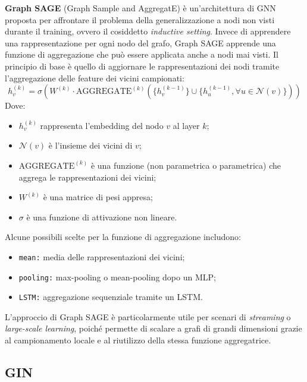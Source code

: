 \textbf{Graph SAGE} (Graph Sample and AggregatE) è un'architettura di GNN proposta per affrontare il problema della generalizzazione a nodi non visti durante il training, ovvero il cosiddetto \textit{inductive setting}. Invece di apprendere una rappresentazione per ogni nodo del grafo, Graph SAGE apprende una funzione di aggregazione che può essere applicata anche a nodi mai visti. Il principio di base è quello di aggiornare le rappresentazioni dei nodi tramite l'aggregazione delle feature dei vicini campionati:
\[
    h_v^{(k)} = \sigma\left(W^{(k)} \cdot \text{AGGREGATE}^{(k)}\left(\{h_v^{(k-1)}\} \cup \{h_u^{(k-1)}, \forall u \in \mathcal{N}(v)\}\right)\right)
\]
Dove:
\begin{itemize}
    \item \( h_v^{(k)} \) rappresenta l'embedding del nodo \( v \) al layer \( k \);
    \item \( \mathcal{N}(v) \) è l'insieme dei vicini di \( v \);
    \item \( \text{AGGREGATE}^{(k)} \) è una funzione (non parametrica o parametrica) che aggrega le rappresentazioni dei vicini;
    \item \( W^{(k)} \) è una matrice di pesi appresa;
    \item \( \sigma \) è una funzione di attivazione non lineare.
\end{itemize}

Alcune possibili scelte per la funzione di aggregazione includono:
\begin{itemize}
    \item \texttt{mean:} media delle rappresentazioni dei vicini;
    \item \texttt{pooling:} max-pooling o mean-pooling dopo un MLP;
    \item \texttt{LSTM:} aggregazione sequenziale tramite un LSTM.
\end{itemize}

L’approccio di Graph SAGE è particolarmente utile per scenari di \textit{streaming} o \textit{large-scale learning}, poiché permette di scalare a grafi di grandi dimensioni grazie al campionamento locale e al riutilizzo della stessa funzione aggregatrice.

\subsection{GIN}

